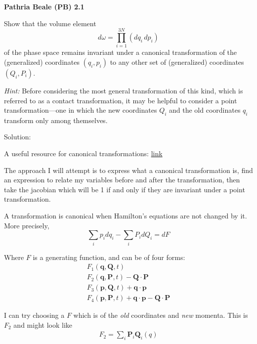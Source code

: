 \newpage
\begin{homeworkProblem}
    \textbf{Pathria Beale (PB) 2.1}

    Show that the volume element
    \[
        d\omega=\prod_{i=1}^{3N}(dq_i\,dp_i)
    \]
    of the phase space remains invariant under a canonical transformation of the
    (generalized) coordinates $(q_i,p_i)$ to any other set of (generalized) coordinates
    $(Q_i,P_i)$.

    \textit{Hint:} Before considering the most general transformation of this kind, which is referred to as a contact transformation, it may be helpful to consider a point transformation---one in which the new coordinates $Q_i$ and the old coordinates $q_i$ transform only among themselves.

    \begin{callout}{Solution:}

        A useful resource for canonical transformations: \href{https://phys.libretexts.org/Bookshelves/Classical_Mechanics/Variational_Principles_in_Classical_Mechanics_%28Cline%29/15%3A_Advanced_Hamiltonian_Mechanics/15.03%3A_Canonical_Transformations_in_Hamiltonian_Mechanics}{link}

        The approach I will attempt is to express what a canonical transformation is, find an expression to relate my variables before and after the transformation, then take the jacobian which will be 1 if and only if they are invariant under a point transformation.
 
        A transformation is canonical when Hamilton's equations are not changed by it. More precisely,
    $$\sum_i p_i dq_i - \sum_i P_i dQ_i = dF$$

    Where $F$ is a generating function, and can be of four forms:
    \begin{align*}
        F_1(\mathbf{q}, \mathbf{Q}, t) \\
        F_{2}(\mathbf{q}, \mathbf{P}, t) - \mathbf{Q}\cdot \mathbf{P} \\
        F_3(\mathbf{p}, \mathbf{Q}, t) + \mathbf{q}\cdot \mathbf{p} \\
        F_{4}(\mathbf{p}, \mathbf{P}, t) + \mathbf{q}\cdot \mathbf{p} - \mathbf{Q}\cdot \mathbf{P}
    \end{align*}

    I can try choosing a $F$ which is of the \textit{old} coordinates and \textit{new} momenta. This is $F_{2}$ and might look like 
    \begin{align*}
        F_{2} = \sum_i \mathbf{P}_i \mathbf{Q}_i(q)        
    \end{align*}


\end{callout}
\end{homeworkProblem}
